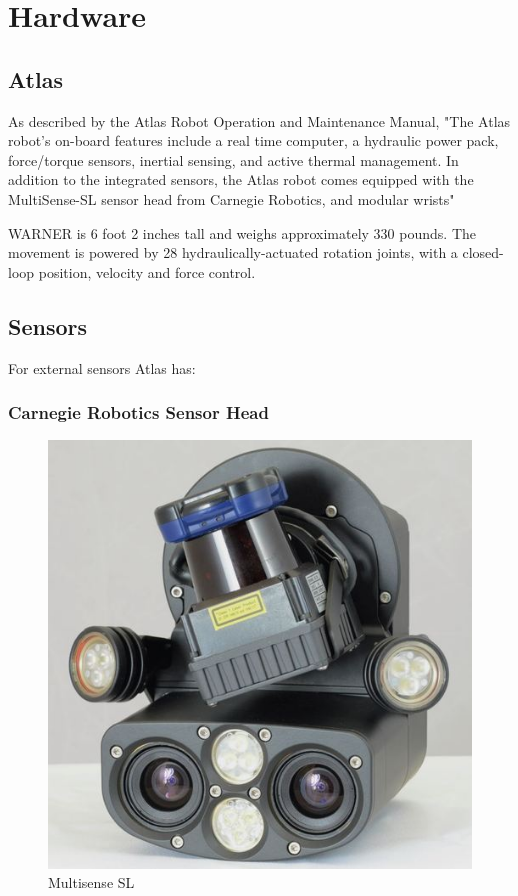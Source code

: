 \documentclass[12pt]{report}
\begin{document}
\section{Hardware}
\subsection{Atlas}

As described by the Atlas Robot Operation and Maintenance Manual, "The Atlas robot’s on-board features include a real time computer, a hydraulic power pack, force/torque sensors, inertial sensing, and active thermal management. In addition to the integrated sensors, the Atlas robot comes equipped with the MultiSense-SL sensor head from Carnegie Robotics, and modular wrists"		

WARNER is 6 foot 2 inches tall and weighs approximately 330 pounds. The movement is powered by 28 hydraulically-actuated rotation joints, with a closed-loop position, velocity and force control. 

\subsection{Sensors}

For external sensors Atlas has:

\subsubsection{Carnegie Robotics Sensor Head}
\begin{figure}
  \begin{center}
    \includegraphics[scale=0.25]{images/sensorhead.jpg}
  \end{center}
  \caption{Multisense SL}
\end{figure}
\end{document}
